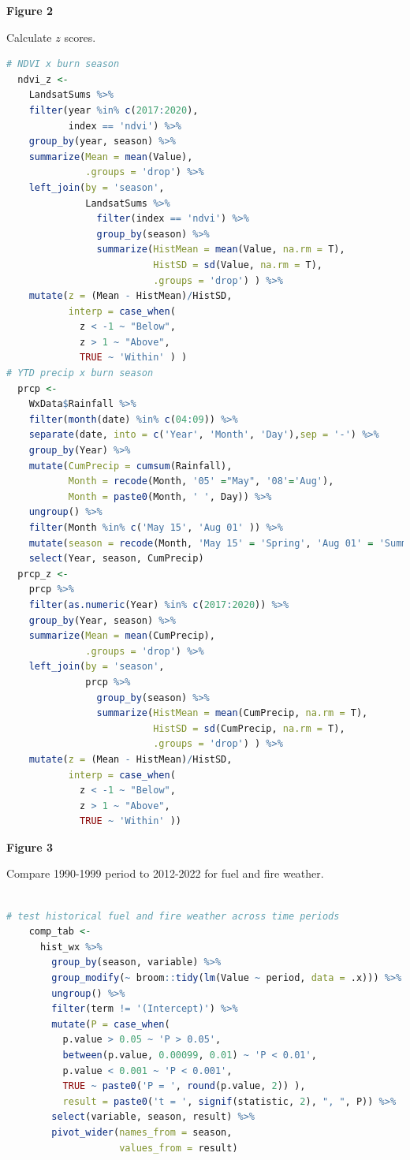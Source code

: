 \documentclass[
]{article}
\begin{document}
\textbf{Figure 2}

Calculate \(z\) scores.

\begin{lstlisting}[language=R]
# NDVI x burn season 
  ndvi_z <-
    LandsatSums %>%
    filter(year %in% c(2017:2020), 
           index == 'ndvi') %>%
    group_by(year, season) %>%
    summarize(Mean = mean(Value), 
              .groups = 'drop') %>%
    left_join(by = 'season', 
              LandsatSums %>%
                filter(index == 'ndvi') %>%
                group_by(season) %>%
                summarize(HistMean = mean(Value, na.rm = T),
                          HistSD = sd(Value, na.rm = T),
                          .groups = 'drop') ) %>%
    mutate(z = (Mean - HistMean)/HistSD, 
           interp = case_when(
             z < -1 ~ "Below", 
             z > 1 ~ "Above", 
             TRUE ~ 'Within' ) )
# YTD precip x burn season 
  prcp <- 
    WxData$Rainfall %>% 
    filter(month(date) %in% c(04:09)) %>%
    separate(date, into = c('Year', 'Month', 'Day'),sep = '-') %>%
    group_by(Year) %>%
    mutate(CumPrecip = cumsum(Rainfall), 
           Month = recode(Month, '05' ="May", '08'='Aug'), 
           Month = paste0(Month, ' ', Day)) %>%
    ungroup() %>%
    filter(Month %in% c('May 15', 'Aug 01' )) %>%
    mutate(season = recode(Month, 'May 15' = 'Spring', 'Aug 01' = 'Summer' )) %>%
    select(Year, season, CumPrecip)
  prcp_z <-
    prcp %>%
    filter(as.numeric(Year) %in% c(2017:2020)) %>%
    group_by(Year, season) %>%
    summarize(Mean = mean(CumPrecip), 
              .groups = 'drop') %>%
    left_join(by = 'season', 
              prcp %>%
                group_by(season) %>%
                summarize(HistMean = mean(CumPrecip, na.rm = T),
                          HistSD = sd(CumPrecip, na.rm = T),
                          .groups = 'drop') ) %>%
    mutate(z = (Mean - HistMean)/HistSD, 
           interp = case_when(
             z < -1 ~ "Below", 
             z > 1 ~ "Above", 
             TRUE ~ 'Within' )) 

\end{lstlisting}

\textbf{Figure 3}

Compare 1990-1999 period to 2012-2022 for fuel and fire weather.

\begin{lstlisting}[language=R]

# test historical fuel and fire weather across time periods 
    comp_tab <-
      hist_wx %>%
        group_by(season, variable) %>%
        group_modify(~ broom::tidy(lm(Value ~ period, data = .x))) %>%
        ungroup() %>%
        filter(term != '(Intercept)') %>%
        mutate(P = case_when(
          p.value > 0.05 ~ 'P > 0.05', 
          between(p.value, 0.00099, 0.01) ~ 'P < 0.01', 
          p.value < 0.001 ~ 'P < 0.001', 
          TRUE ~ paste0('P = ', round(p.value, 2)) ), 
          result = paste0('t = ', signif(statistic, 2), ", ", P)) %>%
        select(variable, season, result) %>%
        pivot_wider(names_from = season, 
                    values_from = result) 
\end{lstlisting}
\end{document}
